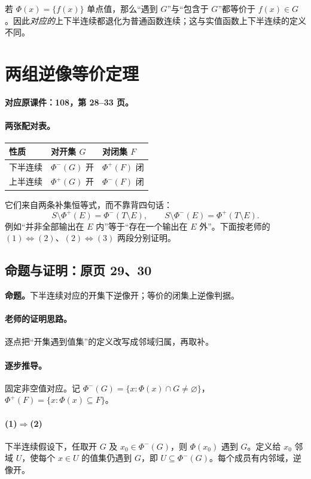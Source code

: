 \documentclass[11pt,a4paper]{article}
\theoremstyle{definition}\newtheorem{definition}{定义}\newtheorem{example}{例}
\begin{document}
若 $\Phi(x)=\{f(x)\}$ 单点值，那么“遇到 $G$”与“包含于 $G$”都等价于 $f(x)\in G$。因此\emph{对应的}上下半连续都退化为普通函数连续；这与实值函数上下半连续的定义不同。


\clearpage\section{两组逆像等价定理}\label{g:108:28}

\textbf{对应原课件：108，第 28--33 页。}


\paragraph{两张配对表。}
\begin{center}\begin{tabular}{lll}\toprule
性质&对开集 $G$&对闭集 $F$\\\midrule
下半连续&$\Phi^-(G)$ 开&$\Phi^+(F)$ 闭\\
上半连续&$\Phi^+(G)$ 开&$\Phi^-(F)$ 闭\\\bottomrule\end{tabular}\end{center}
它们来自两条补集恒等式，而不靠背四句话：
\[S\setminus\Phi^+(E)=\Phi^-(T\setminus E),\qquad
S\setminus\Phi^-(E)=\Phi^+(T\setminus E).\]
例如“并非全部输出在 $E$ 内”等于“存在一个输出在 $E$ 外”。下面按老师的 $(1)\Leftrightarrow(2)$、$(2)\Leftrightarrow(3)$ 两段分别证明。


\subsection{命题与证明：原页 29、30}

\textbf{命题。}下半连续对应的开集下逆像开；等价的闭集上逆像判据。

\paragraph{老师的证明思路。}逐点把“开集遇到值集”的定义改写成邻域归属，再取补。

\paragraph{逐步推导。}
固定非空值对应。记 $\Phi^-(G)=\{x:\Phi(x)\cap G\ne\varnothing\}$，$\Phi^+(F)=\{x:\Phi(x)\subseteq F\}$。
\paragraph{(1)$\Rightarrow$(2)}下半连续假设下，任取开 $G$ 及 $x_0\in\Phi^-(G)$，则 $\Phi(x_0)$ 遇到 $G$。定义给 $x_0$ 邻域 $U$，使每个 $x\in U$ 的值集仍遇到 $G$，即 $U\subseteq\Phi^-(G)$。每个成员有内邻域，逆像开。
\end{document}
